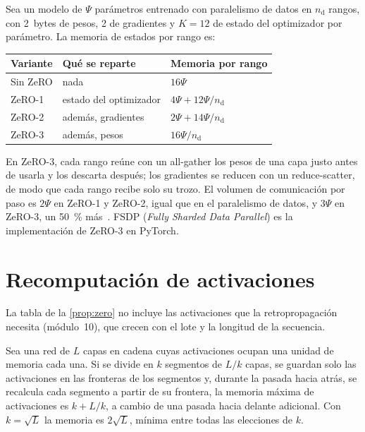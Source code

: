\begin{proposicion}\label{prop:zero}
Sea un modelo de $\Psi$ parámetros entrenado con paralelismo de datos en $n_{\mathrm{d}}$ rangos, con 2~bytes de pesos, 2 de gradientes y $K=12$ de estado del optimizador por parámetro. La memoria de estados por rango es:
\begin{center}\small
\begin{tabular}{@{}lll@{}}
\toprule
Variante & Qué se reparte & Memoria por rango \\
\midrule
Sin ZeRO & nada & $16\Psi$ \\
ZeRO-1 & estado del optimizador & $4\Psi+12\Psi/n_{\mathrm{d}}$ \\
ZeRO-2 & además, gradientes & $2\Psi+14\Psi/n_{\mathrm{d}}$ \\
ZeRO-3 & además, pesos & $16\Psi/n_{\mathrm{d}}$ \\
\bottomrule
\end{tabular}
\end{center}
\end{proposicion}

\addtocounter{definicion}{1}%

En ZeRO-3, cada rango reúne con un all-gather los pesos de una capa justo antes de usarla y los descarta después; los gradientes se reducen con un reduce-scatter, de modo que cada rango recibe solo su trozo. El volumen de comunicación por paso es $2\Psi$ en ZeRO-1 y ZeRO-2, igual que en el paralelismo de datos, y $3\Psi$ en ZeRO-3, un 50~\% más~\cite[§7]{zero}. FSDP (\emph{Fully Sharded Data Parallel}) es la implementación de ZeRO-3 en PyTorch.

\section{Recomputación de activaciones}

La tabla de la \cref{prop:zero} no incluye las activaciones que la retropropagación necesita (módulo~10), que crecen con el lote y la longitud de la secuencia.

\begin{proposicion}\label{prop:checkpoint}
Sea una red de $L$ capas en cadena cuyas activaciones ocupan una unidad de memoria cada una. Si se divide en $k$ segmentos de $L/k$ capas, se guardan solo las activaciones en las fronteras de los segmentos y, durante la pasada hacia atrás, se recalcula cada segmento a partir de su frontera, la memoria máxima de activaciones es $k+L/k$, a cambio de una pasada hacia delante adicional. Con $k=\sqrt{L}$ la memoria es $2\sqrt{L}$, mínima entre todas las elecciones de $k$.
\end{proposicion}

